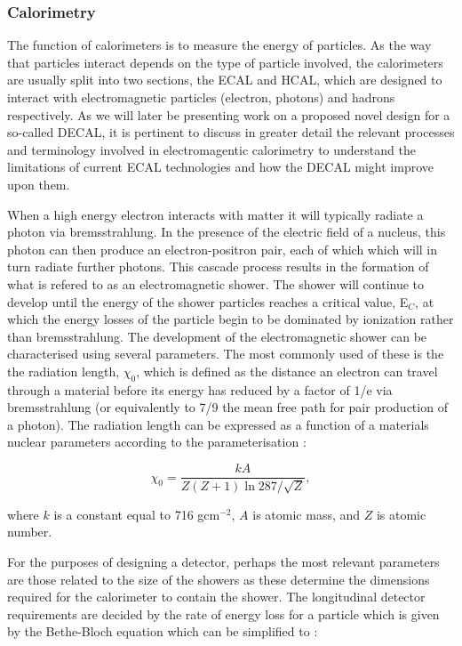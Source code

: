 \subsubsection{Calorimetry}
\label{det:ecal}
The function of calorimeters is to measure the energy of particles. As the way that particles interact depends on the type of particle involved, the calorimeters are usually split into two sections, the \ac{ECAL} and \ac{HCAL}, which are designed to interact with electromagnetic particles (electron, photons) and hadrons respectively. As we will later be presenting work on a proposed novel design for a so-called \ac{DECAL}, it is pertinent to discuss in greater detail the relevant processes and terminology involved in electromagentic calorimetry to understand the limitations of current \ac{ECAL} technologies and how the \ac{DECAL} might improve upon them.

When a high energy electron interacts with matter it will typically radiate a photon via bremsstrahlung. In the presence of the electric field of a nucleus, this photon can then produce an electron-positron pair, each of which which will in turn radiate further photons. This cascade process results in the formation of what is refered to as an electromagnetic shower. The shower will continue to develop until the energy of the shower particles reaches a critical value, E$_{C}$, at which the energy losses of the particle begin to be dominated by ionization rather than bremsstrahlung. The development of the electromagnetic shower can be characterised using several parameters. The most commonly used of these is the the radiation length, $\chi_0$, which is defined as the distance an electron can travel through a material before its energy has reduced by a factor of 1/e via bremsstrahlung (or equivalently to 7/9 the mean free path for pair production of a photon). The radiation length can be expressed as a function of a materials nuclear parameters according to the parameterisation \cite{Groom:1998it}:

\begin{equation}
  \chi_0= \frac{kA}{Z(Z+1)\ln{287/\sqrt{Z}}},
\end{equation}

where $k$ is a constant equal to 716 gcm$^{-2}$, $A$ is atomic mass, and $Z$ is atomic number.

For the purposes of designing a detector, perhaps the most relevant parameters are those related to the size of the showers as these determine the dimensions required for the calorimeter to contain the shower. The longitudinal detector requirements are decided by the rate of energy loss for a particle which is given by the Bethe-Bloch equation which can be simplified to \cite{Beringer:1900zz}:

